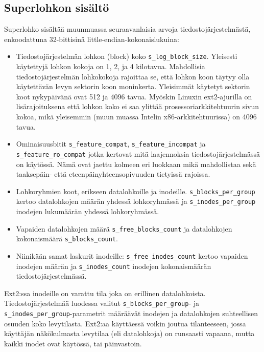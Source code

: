 \subsection{Superlohkon sisältö}
Superlohko sisältää muunmuassa seuraavanlaisia arvoja tiedostojärjestelmästä, enkoodattuna 32-bittisinä little-endian-kokonaislukuina:
\begin{itemize}
    \item Tiedostojärjestelmän lohkon (block) koko \texttt{s\_log\_block\_size}. Yleisesti käytettyjä lohkon kokoja on 1, 2, ja 4 kilotavua.
          Mahdollisia tiedostojärjestelmän lohkokokoja rajoittaa se, että lohkon koon täytyy olla käytettävän levyn sektorin koon moninkerta.
          Yleisimmät käytetyt sektorin koot nykypäivänä ovat 512 ja 4096 tavua.
          Myöskin Linuxin ext2-ajurilla on lisärajoituksena että lohkon koko ei saa ylittää prosessoriarkkitehtuurin sivun kokoa,
          mikä yleisemmin (muun muassa Intelin x86-arkkitehtuurissa) on 4096 tavua.
    \item Ominaisuusbitit \texttt{s\_feature\_compat}, \texttt{s\_feature\_incompat} ja \texttt{s\_feature\_ro\_compat} jotka kertovat mitä laajennoksia tiedostojärjestelmässä on käytössä.
          Nämä ovat jaettu kolmeen eri luokkaan mikä mahdollistaa sekä taaksepäin- että eteenpäinyhteensopivuuden tietyissä rajoissa.
    \item Lohkoryhmien koot, erikseen datalohkoille ja inodeille.
          \texttt{s\_blocks\_per\_group} kertoo datalohkojen määrän yhdessä lohkoryhmässä ja \texttt{s\_inodes\_per\_group} inodejen lukumäärän yhdessä lohkoryhmässä.
    \item Vapaiden datalohkojen määrä \texttt{s\_free\_blocks\_count} ja datalohkojen kokonaismäärä \texttt{s\_blocks\_count}.
    \item Niinikään samat laskurit inodeille: \texttt{s\_free\_inodes\_count} kertoo vapaiden inodejen määrän ja \texttt{s\_inodes\_count} inodejen kokonaismäärän tiedostojärjestelmässä.
\end{itemize}

Ext2:ssa inodeille on varattu tila joka on erillinen datalohkoista.
Tiedostojärjestelmää luodessa valitut \texttt{s\_blocks\_per\_group}- ja \texttt{s\_inodes\_per\_group}-parametrit määräävät inodejen ja datalohkojen suhteellisen osuuden koko levytilasta.
Ext2:aa käyttäessä voikin joutua tilanteeseen, jossa käyttäjän näkökulmasta levytilaa (eli datalohkoja) on runsaasti vapaana, mutta kaikki inodet ovat käytössä, tai päinvastoin.

